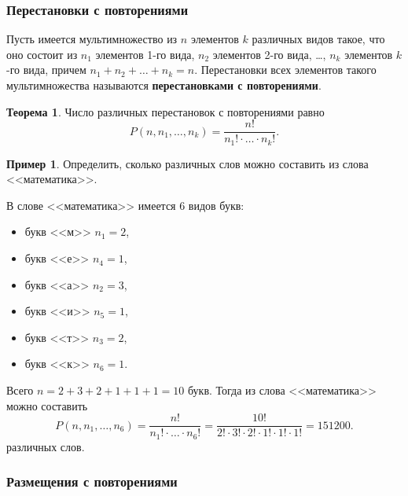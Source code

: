 \documentclass[a5paper, 11pt]{extarticle}
\theoremstyle{definition}
\newtheorem*{theorem*}{Теорема}
\newtheorem*{example*}{Пример}
\theoremstyle{definition}
\theoremstyle{definition}
\numberwithin{figure}{section}
\numberwithin{table}{section}
\begin{document}
\subsubsection{Перестановки с повторениями}

Пусть имеется мультимножество из \(n\) элементов \(k\) различных видов такое, что оно состоит из \(n_1\) элементов 1-го вида, \(n_2\) элементов 2-го вида, \ldots, \(n_k\) элементов \(k\)-го вида, причем \(n_1 + n_2 + \ldots + n_k = n\). Перестановки всех элементов такого мультимножества называются \textbf{перестановками с повторениями}.

\begin{theorem*}
    Число различных перестановок с повторениями равно
    \[
        P(n, n_1, \ldots, n_k) = \frac{n!}{n_1! \cdot \ldots \cdot n_k!}.
    \]
\end{theorem*}

\begin{example*}
    Определить, сколько различных слов можно составить из слова <<математика>>.

    В слове <<математика>> имеется 6 видов букв:
    \begin{multicols}{3}
        \begin{itemize}[label={}]
            \item букв <<м>> \(n_1 = 2\),
            \item букв <<е>> \(n_4 = 1\),
        \end{itemize}
        \begin{itemize}[label={}]
            \item букв <<а>> \(n_2 = 3\),
            \item букв <<и>> \(n_5 = 1\),
        \end{itemize}
        \begin{itemize}[label={}]
            \item букв <<т>> \(n_3 = 2\),
            \item букв <<к>> \(n_6 = 1\).
        \end{itemize}
    \end{multicols}
    Всего \(n = 2 + 3 + 2 + 1 + 1 + 1 = 10\) букв. Тогда из слова <<математика>> можно составить
    \[
        P(n, n_1, \ldots, n_6) = \frac{n!}{n_1! \cdot \ldots \cdot n_6!} = \frac{10!}{2! \cdot 3! \cdot 2! \cdot 1! \cdot 1! \cdot 1!} = 151200.
    \]
    различных слов.
\end{example*}

\subsubsection{Размещения с повторениями}
\end{document}
